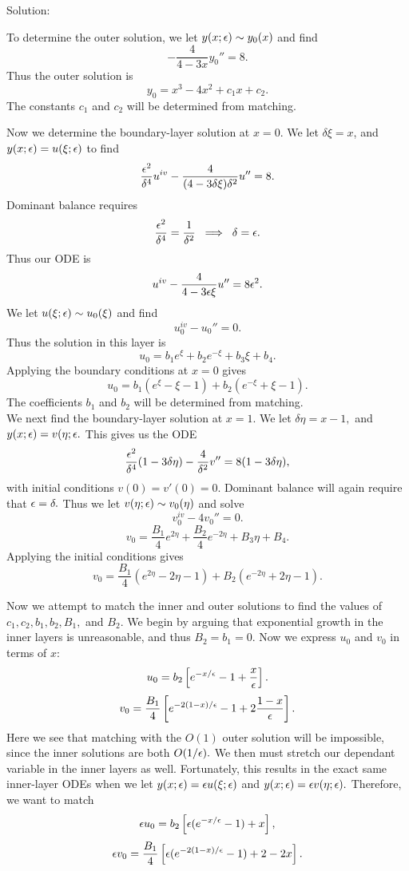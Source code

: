 Solution:\\

\benum \item To determine the outer solution, we let $y(x;\epsilon)\sim y_0(x)$ and find
$$-\frac{4}{4-3x}y_0''=8.$$
Thus the outer solution is
$$y_0=x^3-4x^2+c_1 x+c_2.$$
The constants $c_1$ and $c_2$ will be determined from matching.
\item Now we determine the boundary-layer solution at $x=0.$ We let $\delta \xi=x$, and $y(x;\epsilon)=u(\xi;\epsilon)$ to find
    $$\frac{\epsilon^2}{\delta^4}u^{iv}-\frac{4}{(4-3\delta \xi)\delta^2}u''=8.$$
    Dominant balance requires
    $$\frac{\epsilon^2}{\delta^4}=\frac{1}{\delta^2}\;\implies\;\delta=\epsilon.$$
    Thus our ODE is
    $$u^{iv}-\frac{4}{4-3\epsilon\xi}u''=8\epsilon^2.$$
    We let $u(\xi;\epsilon)\sim u_0(\xi)$ and find
    $$u_0^{iv}-u_0''=0.$$
    Thus the solution in this layer is
    $$u_0=b_1e^{\xi}+b_2e^{-\xi}+b_3\xi+b_4.$$
    Applying the boundary conditions at $x=0$ gives
    $$u_0=b_1\left(e^{\xi}-\xi-1\right)+b_2\left(e^{-\xi}+\xi-1\right).$$
    The coefficients $b_1$ and $b_2$ will be determined from matching.\\
    \indent We next find the boundary-layer solution at $x=1.$ We let $\delta\eta=x-1,$ and $y(x;\epsilon)=v(\eta;\epsilon.$ This gives us the ODE
    $$\frac{\epsilon^2}{\delta^4}(1-3\delta\eta)-\frac{4}{\delta^2}v''=8(1-3\delta\eta),$$
    with initial conditions $v(0)=v'(0)=0.$ Dominant balance will again require that $\epsilon=\delta.$ Thus we let $v(\eta;\epsilon)\sim v_0(\eta)$ and solve
    $$v_0^{iv}-4v_0''=0.$$
    $$v_0=\frac{B_1}{4}e^{2\eta}+\frac{B_2}{4}e^{-2\eta}+B_3\eta+B_4.$$
    Applying the initial conditions gives
    $$v_0=\frac{B_1}{4}(e^{2\eta}-2\eta-1)+B_2(e^{-2\eta}+2\eta-1).$$
    \item Now we attempt to match the inner and outer solutions to find the values of $c_1,c_2,b_1,b_2,B_1,$ and $B_2.$ We begin by arguing that exponential growth in the inner layers is unreasonable, and thus $B_2=b_1=0.$ Now we express $u_0$ and $v_0$ in terms of $x$:
        $$u_0=b_2\left[e^{-x/\epsilon}-1+\frac{x}{\epsilon}\right].$$
        $$v_0=\frac{B_1}{4}\left[e^{-2(1-x)/\epsilon}-1+2\frac{1-x}{\epsilon}\right].$$
        Here we see that matching with the $O(1)$ outer solution will be impossible, since the inner solutions are both $O(1/\epsilon).$ We then must stretch our dependant variable in the inner layers as well. Fortunately, this results in the exact same inner-layer ODEs when we let $y(x;\epsilon)=\epsilon u(\xi;\epsilon)$ and $y(x;\epsilon)=\epsilon v(\eta;\epsilon).$ Therefore, we want to match 
        $$\epsilon u_0=b_2\left[\epsilon(e^{-x/\epsilon}-1)+x\right],$$
        $$\epsilon v_0=\frac{B_1}{4}\left[\epsilon(e^{-2(1-x)/\epsilon}-1)+2-2x\right].$$
